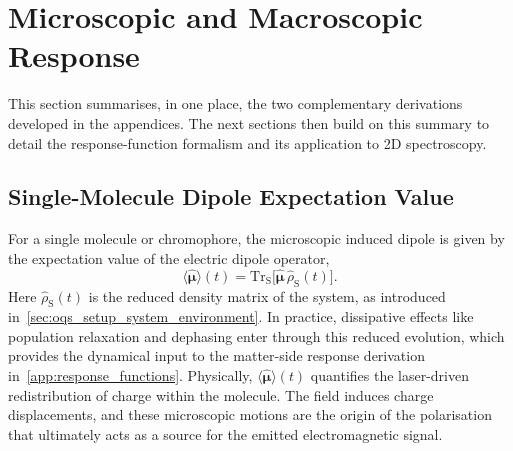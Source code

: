 \section{Microscopic and Macroscopic Response}
\label{spctr:sec:macroscopic_polarisation}
This section summarises, in one place, the two complementary derivations developed in the appendices. The next sections then build on this summary to detail the response-function formalism and its application to 2D spectroscopy.

\subsection{Single-Molecule Dipole Expectation Value}
For a single molecule or chromophore, the microscopic induced dipole is given by the expectation value of the electric dipole operator,
\begin{equation}
\langle\hat{\boldsymbol{\mu}}\rangle(t)
= \mathrm{Tr}_{\mathrm{S}}\!\bigl[
\hat{\boldsymbol{\mu}}\,\hat{\rho}_{\mathrm{S}}(t)
\bigr].
\label{eq:spctr_P_def_spectroscopy}
\end{equation}
Here $\hat{\rho}_{\mathrm{S}}(t)$ is the reduced density matrix of the system, as introduced in~\autoref{sec:oqs_setup_system_environment}.
In practice, dissipative effects like population relaxation and dephasing enter through this reduced evolution, which provides the dynamical input to the matter-side response derivation in~\autoref{app:response_functions}.
Physically, $\langle\hat{\boldsymbol{\mu}}\rangle(t)$ quantifies the laser-driven redistribution of charge within the molecule.
The field induces charge displacements, and these microscopic motions are the origin of the polarisation that ultimately acts as a source for the emitted electromagnetic signal.

